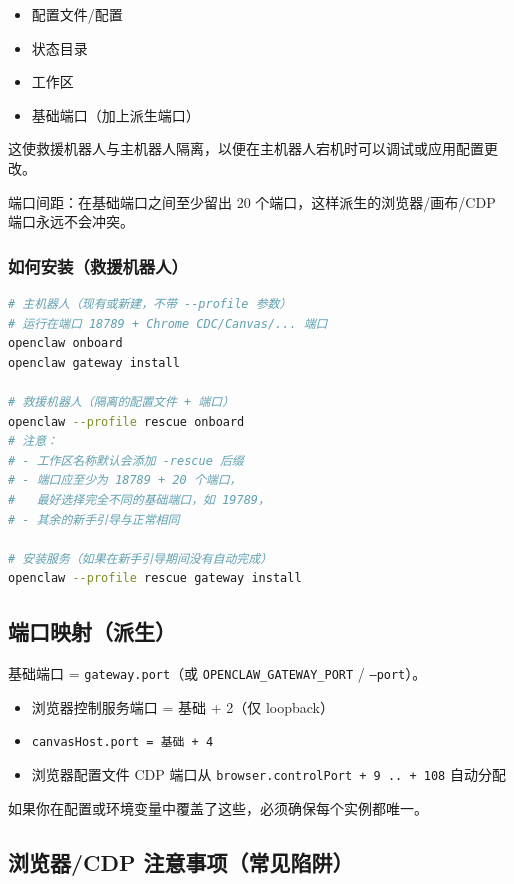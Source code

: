\begin{itemize}
  \item 配置文件/配置
  \item 状态目录
  \item 工作区
  \item 基础端口（加上派生端口）
\end{itemize}


这使救援机器人与主机器人隔离，以便在主机器人宕机时可以调试或应用配置更改。

端口间距：在基础端口之间至少留出 20 个端口，这样派生的浏览器/画布/CDP 端口永远不会冲突。

\subsubsection{如何安装（救援机器人）}


\begin{lstlisting}[language=bash]
# 主机器人（现有或新建，不带 --profile 参数）
# 运行在端口 18789 + Chrome CDC/Canvas/... 端口
openclaw onboard
openclaw gateway install

# 救援机器人（隔离的配置文件 + 端口）
openclaw --profile rescue onboard
# 注意：
# - 工作区名称默认会添加 -rescue 后缀
# - 端口应至少为 18789 + 20 个端口，
#   最好选择完全不同的基础端口，如 19789，
# - 其余的新手引导与正常相同

# 安装服务（如果在新手引导期间没有自动完成）
openclaw --profile rescue gateway install
\end{lstlisting}


\subsection{端口映射（派生）}


基础端口 = \texttt{gateway.port}（或 \texttt{OPENCLAW\_GATEWAY\_PORT} / \texttt{--port}）。

\begin{itemize}
  \item 浏览器控制服务端口 = 基础 + 2（仅 loopback）
  \item \texttt{canvasHost.port = 基础 + 4}
  \item 浏览器配置文件 CDP 端口从 \texttt{browser.controlPort + 9 .. + 108} 自动分配
\end{itemize}


如果你在配置或环境变量中覆盖了这些，必须确保每个实例都唯一。

\subsection{浏览器/CDP 注意事项（常见陷阱）}


